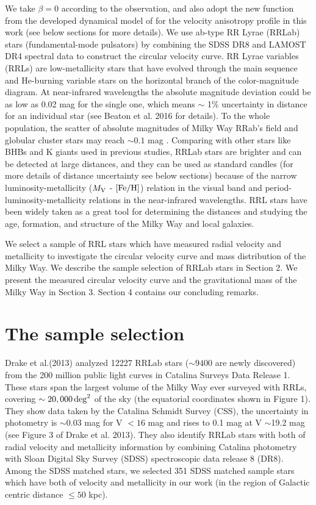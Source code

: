 \documentclass[12pt,preprint]{aastex}
\begin{document}
 We take $\beta=0$ according to the observation, and also
adopt the new function from the developed dynamical model of \cite{wi15} for the velocity anisotropy profile in this work (see below sections for more details). We use ab-type RR
Lyrae (RRLab) stars (fundamental-mode pulsators) by combining the
SDSS DR8 and LAMOST DR4 spectral data to construct the circular velocity curve. RR Lyrae
variables (RRLs) are low-metallicity stars that have evolved through
the main sequence and He-burning variable stars on the horizontal
branch of the color-magnitude diagram. At near-infrared wavelengths
the absolute magnitude deviation could be as low as 0.02 mag for the single one, which means $\sim$ 1\%
uncertainty in distance for an individual star (see Beaton et al.
2016 for details). To the whole population, the scatter of absolute magnitudes of Milky Way RRab's field and globular cluster stars may reach $\sim 0.1$ mag \citep{da13,da14}. Comparing with other stars like BHBs and K giants
used in previous studies, RRLab stars are brighter and can be
detected at large distances, and they can be used as standard
candles (for more details of distance uncertainty see
below sections) because of the narrow luminosity-metallicity ($M_{\rm V}$ -
$[\rm Fe/H]$) relation in the visual band and
period-luminosity-metallicity relations in the near-infrared
wavelengths. RRL stars have been widely taken as a great tool for
determining the distances and studying the age, formation, and
structure of the Milky Way and local galaxies.


We select a sample of RRL stars which have measured radial velocity
and metallicity to investigate the circular velocity curve and mass
distribution of the Milky Way. We describe the sample selection of
RRLab stars in Section 2. We present the measured circular velocity
curve and the gravitational mass of the Milky Way in Section 3.
Section 4 contains our concluding remarks.

\section{The sample selection}
\label{sec:model}


Drake et al.(2013) analyzed 12227 RRLab stars ($\sim 9400$ are newly
discovered) from the 200 million public light curves in Catalina
Surveys Data Release 1. These stars span the largest volume of the
Milky Way ever surveyed with RRLs, covering $\sim 20,000\,
\rm{deg}^2$ of the sky (the equatorial coordinates shown in Figure 1). They
show data taken by the Catalina Schmidt Survey (CSS), the uncertainty in photometry is $\sim$0.03 mag
for V $<16$ mag and rises to 0.1 mag at V $\sim$19.2 mag (see Figure
3 of Drake et al. 2013). They also
identify RRLab stars with both of radial velocity and metallicity
information by combining Catalina photometry with Sloan Digital Sky
Survey (SDSS) spectroscopic data release 8 (DR8). Among the SDSS
matched stars, we selected 351 SDSS matched sample stars which have
both of velocity and metallicity in our work (in the region of
Galactic centric distance $\leq 50$ kpc).
\end{document}
